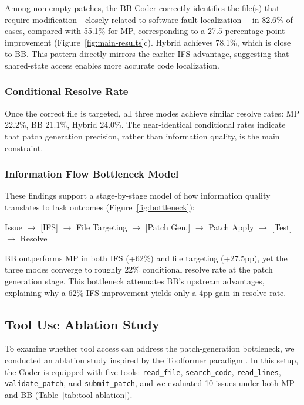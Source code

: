 \documentclass{ieeeaccess}
\begin{document}
Among non-empty patches, the BB Coder correctly identifies the file(s) that require modification---closely related to software fault localization \cite{wong2016survey}---in 82.6\% of cases, compared with 55.1\% for MP, corresponding to a 27.5 percentage-point improvement (Figure~\ref{fig:main-results}c). Hybrid achieves 78.1\%, which is close to BB. This pattern directly mirrors the earlier IFS advantage, suggesting that shared-state access enables more accurate code localization.

\subsubsection{Conditional Resolve Rate}

Once the correct file is targeted, all three modes achieve similar resolve rates: MP 22.2\%, BB 21.1\%, Hybrid 24.0\%. The near-identical conditional rates indicate that patch generation precision, rather than information quality, is the main constraint.

\subsubsection{Information Flow Bottleneck Model}

These findings support a stage-by-stage model of how information quality translates to task outcomes (Figure~\ref{fig:bottleneck}):

Issue $\rightarrow$ [IFS] $\rightarrow$ File Targeting $\rightarrow$ [Patch Gen.] $\rightarrow$ Patch Apply $\rightarrow$ [Test] $\rightarrow$ Resolve

BB outperforms MP in both IFS (+62\%) and file targeting (+27.5pp), yet the three modes converge to roughly 22\% conditional resolve rate at the patch generation stage. This bottleneck attenuates BB's upstream advantages, explaining why a 62\% IFS improvement yields only a 4pp gain in resolve rate.

\subsection{Tool Use Ablation Study}
\label{sec:tool-ablation-study}

To examine whether tool access can address the patch-generation bottleneck, we conducted an ablation study inspired by the Toolformer paradigm \cite{schick2023toolformer}. In this setup, the Coder is equipped with five tools: \texttt{read\_file}, \texttt{search\_code}, \texttt{read\_lines}, \texttt{validate\_patch}, and \texttt{submit\_patch}, and we evaluated 10 issues under both MP and BB (Table~\ref{tab:tool-ablation}).
\end{document}
